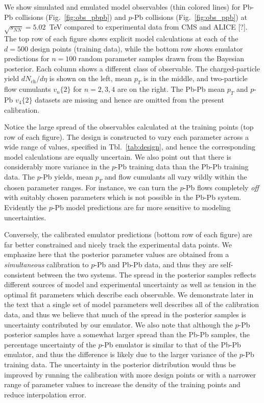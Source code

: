 \documentclass[aps,prc,reprint,amsmath,nofootinbib]{revtex4-1}
\newcommand{\sqrts}{\sqrt{s_{NN}}}
\newcommand{\nch}{N_\text{ch}}
\newcommand{\vnk}[2]{v_#1\{#2\}}
\newcommand{\note}{\textcolor{theblue}{[?]}}
\begin{document}
We show simulated and emulated model observables (thin colored lines) for Pb-Pb collisions (Fig.~\ref{fig:obs_pbpb}) and \mbox{$p$-Pb} collisions (Fig.~\ref{fig:obs_ppb}) at $\sqrts=5.02$~TeV compared to experimental data from CMS and ALICE \note.
The top row of each figure shows explicit model calculations at each of the $d=500$ design points (training data), while the bottom row shows emulator predictions for $n=100$ random parameter samples drawn from the Bayesian posterior.
Each column shows a different class of observable.
The charged-particle yield $d\nch/d\eta$ is shown on the left, mean $p_T$ is in the middle, and two-particle flow cumulants $\vnk{n}{2}$ for $n=2,3,4$ are on the right.
The Pb-Pb mean $p_T$ and $p$-Pb $\vnk{4}{2}$ datasets are missing and hence are omitted from the present calibration.

Notice the large spread of the observables calculated at the training points (top row of each figure).
The design is constructed to vary each parameter across a wide range of values, specified in Tbl.~\ref{tab:design}, and hence the corresponding model calculations are equally uncertain.
We also point out that there is considerably more variance in the $p$-Pb training data than the Pb-Pb training data.
The $p$-Pb yields, mean $p_T$ and flow cumulants all vary wildly within the chosen parameter ranges.
For instance, we can turn the $p$-Pb flows completely \emph{off} with suitably chosen parameters which is not possible in the Pb-Pb system.
Evidently the $p$-Pb model predictions are far more sensitive to modeling uncertainties.

Conversely, the calibrated emulator predictions (bottom row of each figure) are far better constrained and nicely track the experimental data points.
We emphasize here that the posterior parameter values are obtained from a \emph{simultaneous} calibration to $p$-Pb and Pb-Pb data, and thus they are self-consistent between the two systems.
The spread in the posterior samples reflects different sources of model and experimental uncertainty as well as tension in the optimal fit parameters which describe each observable.
We demonstrate later in the text that a single set of model parameters well describes all of the calibration data, and thus we believe that much of the spread in the posterior samples is uncertainty contributed by our emulator.
We also note that although the $p$-Pb posterior samples have a somewhat larger spread than the Pb-Pb samples, the percentage uncertainty of the $p$-Pb emulator is similar to that of the Pb-Pb emulator, and thus the difference is likely due to the larger variance of the $p$-Pb training data.
The uncertainty in the posterior distribution would thus be improved by running the calibration with more design points or with a narrower range of parameter values to increase the density of the training points and reduce interpolation error.
\end{document}
